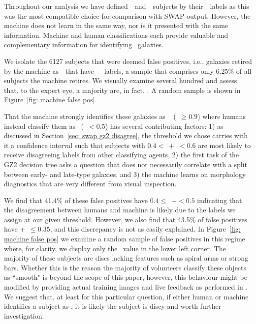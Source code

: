 Throughout our analysis we have defined~\feat~and~\notfeat~subjects by 
their~\raw~labels as this was the most compatible choice for comparison with SWAP output.  
However, the machine does not learn in the same way, nor is it presented with the 
same information. Machine and human classifications 
each provide valuable and complementary information for identifying \feat~galaxies.

We isolate the 6127 subjects that were deemed false positives, i.e., galaxies 
retired by the machine as~\feat~that have~\notfeat~\raw~labels, a sample that
comprises only 6.25\% of all subjects the machine retires.
We visually examine several hundred
and assess that, to the expert eye, a majority are, in fact, \feat.  
A random sample is shown in Figure~\ref{fig: machine false pos}. 


That the machine strongly identifies these galaxies as \feat~
(\pmachine~$\ge 0.9$) where humans instead classify them as \notfeat~(\ffeat~$< 0.5$) 
has several contributing factors: 1) as discussed in Section~\ref{sec: swap gz2 disagree}, 
the threshold we chose carries with it a confidence interval such that subjects with 
$0.4 <$~\ffeat+\fstar~$< 0.6$ are most likely to receive disagreeing labels from 
other classifying agents, 2) the first task of the GZ2 decision tree asks a 
question that does not necessarily correlate with a split between early- and
 late-type galaxies, and 3) the machine learns on morphology diagnostics
 that are very different from visual inspection.

We find that 41.4\% of these false positives have $0.4 \le$~\ffeat+\fstar$<0.5$ 
indicating that the disagreement between humans and machine is likely due to the 
labels we assign at our given threshold. However, we also find that 43.5\% of false 
positives have \ffeat+\fstar~$\le0.35$, and this discrepancy is not as easily explained. 
 In Figure~\ref{fig: machine false pos} we examine a random sample of false positives 
in this regime where, for clarity, we display only the \ffeat~value in the lower left corner. 
The majority of these subjects are discs lacking features such as spiral arms or strong bars. 
Whether this is the reason the majority of volunteers classify these objects as 
``smooth" is beyond the scope of this paper, however, this behaviour might be 
modified by providing actual training images and live feedback as performed in
 \cite{Marshall2016}. We suggest that, at least for this particular question, 
if either human or machine identifies a subject as \feat, it is likely the subject 
is discy and worth further investigation.


